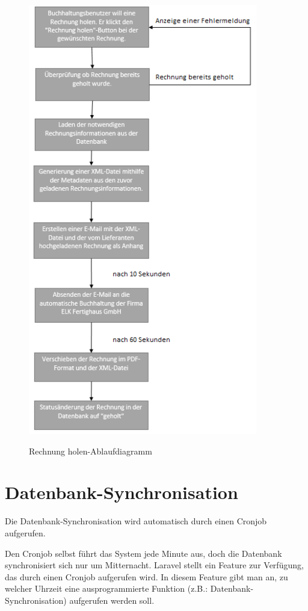 \begin{figure}[!h]
    \centering
    \includegraphics[width=10cm]{figures/billtaken.png}
    \label{fig:takebill}
    \caption{Rechnung holen-Ablaufdiagramm}
\end{figure}
\newpage

\section{Datenbank-Synchronisation}
Die Datenbank-Synchronisation wird automatisch durch einen Cronjob aufgerufen.

Den Cronjob selbst führt das System jede Minute aus, doch die Datenbank synchronisiert sich nur um Mitternacht. Laravel stellt ein Feature zur Verfügung, das durch einen Cronjob aufgerufen wird. In diesem Feature gibt man an, zu welcher Uhrzeit eine ausprogrammierte Funktion (z.B.: Datenbank-Synchronisation) aufgerufen werden soll.

